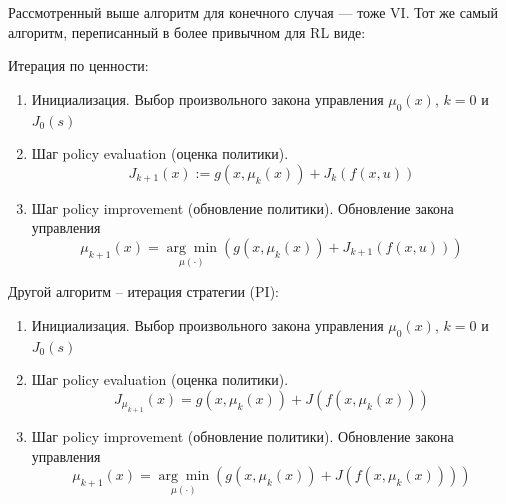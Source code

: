 Рассмотренный выше алгоритм для конечного случая — тоже VI. Тот же самый алгоритм, переписанный в более привычном для RL виде:

Итерация по ценности:
\begin{enumerate}[1.]
	\item Инициализация. Выбор произвольного закона управления $\mu_0(x)$, $k=0$ и $J_0(s)$
	\item Шаг policy evaluation (оценка политики).
	\begin{equation*}
		J_{k+1}(x):=g(x, \mu_k(x)) + J_k(f(x,u))
	\end{equation*}
	
	\item Шаг policy improvement (обновление политики). Обновление закона управления
	\begin{equation*}
		\mu_{k+1}(x) =  \underset{\mu(\cdot)}{\arg\min}(g(x, \mu_k(x)) + J_{k+1}(f(x,u)))
	\end{equation*}
\end{enumerate}

Другой алгоритм -- итерация стратегии (PI):

\begin{enumerate}[1.]
	\item Инициализация. Выбор произвольного закона управления $\mu_0(x)$, $k=0$ и $J_0(s)$
	\item Шаг policy evaluation (оценка политики).
	\begin{equation*}
		J_{\mu_{k+1}}(x)=g(x, \mu_k(x)) + J(f(x,\mu_k(x)))
	\end{equation*}
	
	\item Шаг policy improvement (обновление политики). Обновление закона управления
	\begin{equation*}
		\mu_{k+1}(x) =  \underset{\mu(\cdot)}{\arg\min}(g(x, \mu_k(x)) + J(f(x,\mu_k(x))))
	\end{equation*}
\end{enumerate}




